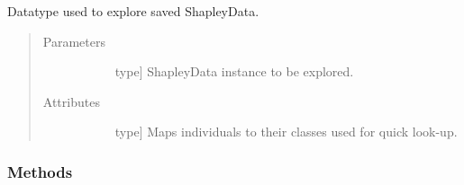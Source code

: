\documentclass[letterpaper,10pt,english]{sphinxmanual}
\begin{document}

\begin{fulllineitems}
\label{\detokenize{index:methylnet.interpretation_classes.ShapleyDataExplorer}}
Datatype used to explore saved ShapleyData.
\begin{quote}\begin{description}
\item[{Parameters}] \leavevmode\begin{description}
\item[{}] \leavevmode{[}type{]}
ShapleyData instance to be explored.

\end{description}

\item[{Attributes}] \leavevmode\begin{description}
\item[{}] \leavevmode{[}type{]}
Maps individuals to their classes used for quick look-up.

\item[{}] \leavevmode
\end{description}

\end{description}\end{quote}
\subsubsection*{Methods}


\begin{savenotes}\sphinxatlongtablestart\begin{longtable}{}
\hline

\endfirsthead

%
{}\\
\hline

\endhead

\hline
{}\\
\endfoot


\end{longtable}
\end{savenotes}
\end{fulllineitems}
\end{document}
